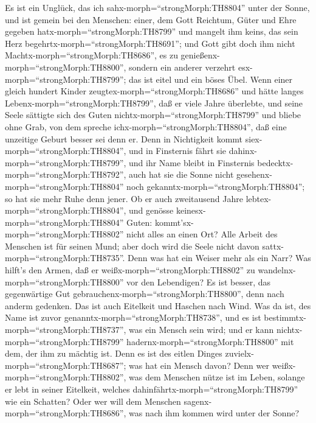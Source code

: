  Es ist ein Unglück, das ich
sahx-morph=``strongMorph:TH8804'' unter der Sonne, und ist gemein bei
den Menschen:  einer, dem Gott Reichtum, Güter und Ehre
gegeben hatx-morph=``strongMorph:TH8799'' und mangelt ihm keins, das
sein Herz begehrtx-morph=``strongMorph:TH8691''; und Gott gibt doch ihm
nicht Machtx-morph=``strongMorph:TH8686'', es zu
genießenx-morph=``strongMorph:TH8800'', sondern ein anderer verzehrt
esx-morph=``strongMorph:TH8799''; das ist eitel und ein böses Übel.
 Wenn einer gleich hundert Kinder
zeugtex-morph=``strongMorph:TH8686'' und hätte langes
Lebenx-morph=``strongMorph:TH8799'', daß er viele Jahre überlebte, und
seine Seele sättigte sich des Guten nichtx-morph=``strongMorph:TH8799''
und bliebe ohne Grab, von dem spreche ichx-morph=``strongMorph:TH8804'',
daß eine unzeitige Geburt besser sei denn er.  Denn in
Nichtigkeit kommt siex-morph=``strongMorph:TH8804'', und in Finsternis
fährt sie dahinx-morph=``strongMorph:TH8799'', und ihr Name bleibt in
Finsternis bedecktx-morph=``strongMorph:TH8792'',  auch hat
sie die Sonne nicht gesehenx-morph=``strongMorph:TH8804'' noch
gekanntx-morph=``strongMorph:TH8804''; so hat sie mehr Ruhe denn jener.
 Ob er auch zweitausend Jahre
lebtex-morph=``strongMorph:TH8804'', und genösse
keinesx-morph=``strongMorph:TH8804'' Guten:
kommt'sx-morph=``strongMorph:TH8802'' nicht alles an einen Ort?
 Alle Arbeit des Menschen ist für seinen Mund; aber doch
wird die Seele nicht davon sattx-morph=``strongMorph:TH8735''.
 Denn was hat ein Weiser mehr als ein Narr? Was hilft's den
Armen, daß er weißx-morph=``strongMorph:TH8802'' zu
wandelnx-morph=``strongMorph:TH8800'' vor den Lebendigen? 
Es ist besser, das gegenwärtige Gut
gebrauchenx-morph=``strongMorph:TH8800'', denn nach anderm gedenken. Das
ist auch Eitelkeit und Haschen nach Wind.  Was da ist, des
Name ist zuvor genanntx-morph=``strongMorph:TH8738'', und es ist
bestimmtx-morph=``strongMorph:TH8737'', was ein Mensch sein wird; und er
kann nichtx-morph=``strongMorph:TH8799''
hadernx-morph=``strongMorph:TH8800'' mit dem, der ihm zu mächtig ist.
 Denn es ist des eitlen Dinges
zuvielx-morph=``strongMorph:TH8687''; was hat ein Mensch davon?
 Denn wer weißx-morph=``strongMorph:TH8802'', was dem
Menschen nütze ist im Leben, solange er lebt in seiner Eitelkeit,
welches dahinfährtx-morph=``strongMorph:TH8799'' wie ein Schatten? Oder
wer will dem Menschen sagenx-morph=``strongMorph:TH8686'', was nach ihm
kommen wird unter der Sonne?

